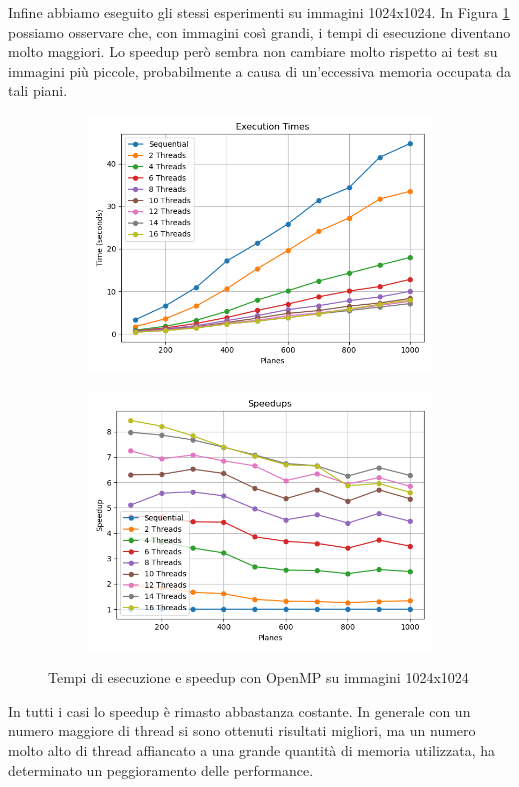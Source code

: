 Infine abbiamo eseguito gli stessi esperimenti su immagini 1024x1024.
In Figura \ref{fig:omp_1024} possiamo osservare che, con immagini così grandi, i tempi di esecuzione diventano molto maggiori.
Lo speedup però sembra non cambiare molto rispetto ai test su immagini più piccole, probabilmente a causa di un'eccessiva memoria occupata da tali piani.
\begin{figure}[H]
    \centering
    \begin{subfigure}{0.49\textwidth}
        \centering
        \includegraphics[width=\textwidth]{../result_16/plots/1024/results_times}
    \end{subfigure}
    \begin{subfigure}{0.49\textwidth}
        \centering
        \includegraphics[width=\textwidth]{../result_16/plots/1024/results_speedup}
    \end{subfigure}
    \caption{Tempi di esecuzione e speedup con OpenMP su immagini 1024x1024}
    \label{fig:omp_1024}
\end{figure}
In tutti i casi lo speedup è rimasto abbastanza costante.
In generale con un numero maggiore di thread si sono ottenuti risultati migliori, ma un numero molto alto di thread affiancato a una grande quantità di memoria utilizzata, ha determinato un peggioramento delle performance.

